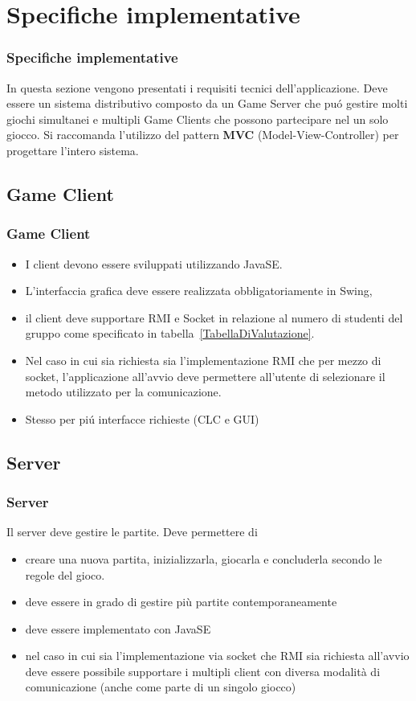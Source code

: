 \documentclass{beamer}
\begin{document}
\section{Specifiche implementative}
\begin{frame}
\frametitle{Specifiche implementative}
In questa sezione vengono presentati i requisiti tecnici
dell'applicazione.  Deve essere un sistema distributivo composto da
un Game Server che pu\'o gestire molti giochi simultanei e multipli
Game Clients che possono partecipare nel un solo giocco. Si raccomanda
l'utilizzo del pattern \textbf{MVC} (Model-View-Controller) per
progettare l'intero sistema.
\end{frame}

\subsection{Game Client}
\begin{frame}
\frametitle{Game Client}
\begin{itemize}
\item I client devono essere sviluppati utilizzando JavaSE. 
\item L'interfaccia grafica deve essere realizzata obbligatoriamente in Swing, 
\item il client deve supportare RMI e Socket in relazione al numero di studenti del gruppo come specificato in tabella~\ref{TabellaDiValutazione}. 
\item Nel caso in cui sia richiesta sia l'implementazione RMI che per
  mezzo di socket, l'applicazione all'avvio deve permettere all'utente
  di selezionare il metodo utilizzato per la comunicazione.
\item Stesso per pi\'u interfacce richieste (CLC e GUI)
\end{itemize}
\end{frame}

\subsection{Server}
\begin{frame}
\frametitle{Server}
Il server deve gestire le partite. Deve permettere di 
\begin{itemize}
\item creare una nuova partita, inizializzarla, giocarla e concluderla secondo le regole del gioco.
\item deve essere in grado di gestire pi\`u partite contemporaneamente
\item deve essere implementato con JavaSE
\item nel caso in cui sia l'implementazione via socket che RMI sia
  richiesta all'avvio deve essere possibile supportare i multipli
  client con diversa modalità di comunicazione (anche come parte di un
  singolo giocco)
\end{itemize}
\end{frame}
\end{document}
